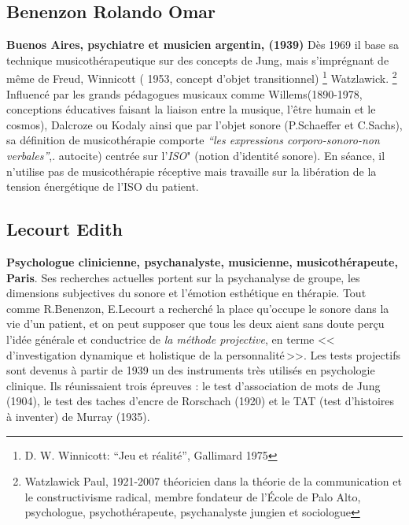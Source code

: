           

         

  \subsection{Benenzon Rolando Omar} 
	\textbf{ Buenos Aires, psychiatre et
    musicien argentin, (1939)}
	  \label{benenzon}
	  Dès 1969 il base sa technique 
	  musicothérapeutique sur des concepts 
	  de Jung, mais s'imprégnant de même de Freud, Winnicott (
          1953, concept d'objet transitionnel) \footnote{
          D. W. Winnicott: ``Jeu et réalité'', Gallimard 1975 }
          Watzlawick. \footnote{ Watzlawick Paul, 1921-2007  théoricien dans la théorie de la communication et le constructivisme radical, membre fondateur de l'École de Palo Alto, psychologue, psychothérapeute, psychanalyste jungien et sociologue} 
	  Influencé par les grands  pédagogues musicaux comme
          Willems(1890-1978, conceptions éducatives faisant la liaison
          entre la musique, l'être humain et le cosmos),
          Dalcroze ou Kodaly ainsi que par l'objet sonore (P.Schaeffer
          et C.Sachs), sa définition de musicothérapie comporte  
	  \emph{\textsl{ ``les expressions corporo-sonoro-non
              verbales''}},\autocite{benenzon:musicotherapie}.
 autocite)
	  centrée sur l'\textit{ISO}" (notion
          d'identité sonore). En séance, il n'utilise pas de
          musicothérapie réceptive mais travaille sur la libération de
          la tension énergétique de l'ISO du patient.

        \subsection{Lecourt Edith}
      \textbf{Psychologue clinicienne,
          psychanalyste, musicienne, musicothérapeute, Paris}. Ses recherches
        actuelles portent sur la psychanalyse de groupe, les
        dimensions subjectives du sonore  et l'émotion esthétique en thérapie.
   Tout comme R.Benenzon, E.Lecourt a recherché  la place qu'occupe le sonore dans la vie d'un 
        patient, et on peut supposer que tous les deux aient sans doute perçu l'idée générale et 
        conductrice de \emph{la méthode projective}, 
        en terme 
	    <<\,d'investigation dynamique et holistique de la
            personnalité\,>>.
            Les tests projectifs sont devenus à partir
        de 1939 un des instruments très utilisés en psychologie
        clinique. Ils réunissaient trois épreuves : le test
        d'association de mots de Jung (1904), le test des taches
        d'encre de Rorschach (1920) et le TAT (test d'histoires à
        inventer) de Murray (1935)\autocite[ch.~1, p.~13]{anzieu.chabert:methodes}.

